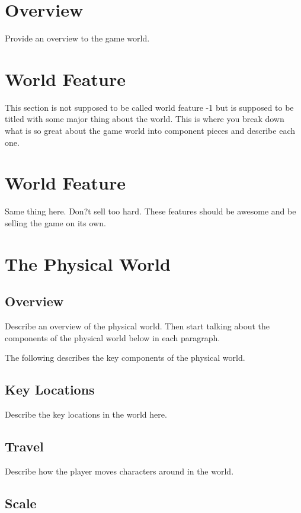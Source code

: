 \documentclass[a4paper]{report}
\begin{document}
	\section{Overview}

		Provide an overview to the game world.

	\section{World Feature}

		This section is not supposed to be called world feature -1 but is supposed to be titled with some major thing about the world.  This is where you break down what is so great about the game world into component pieces and describe each one.

	\section{World Feature}

		Same thing here.  Don?t sell too hard.  These features should be awesome and be selling the game on its own.

	\section{The Physical World}

		\subsection{Overview}

				Describe an overview of the physical world.  Then start talking about the components of the physical world below in each paragraph.

				The following describes the key components of the physical world.

		\subsection{Key Locations}

				Describe the key locations in the world here.

		\subsection{Travel}

				Describe how the player moves characters around in the world.

		\subsection{Scale}
\end{document}
